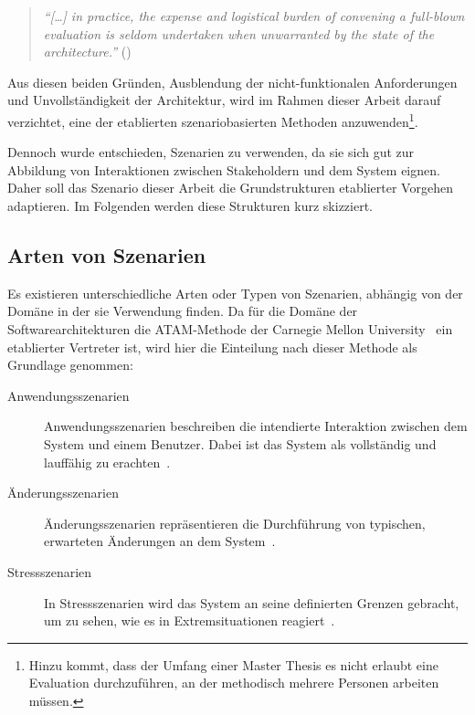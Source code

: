   \begin{quote}
    \emph{"`[\ldots] in practice, the expense and logistical burden of convening a full-blown evaluation is seldom undertaken when unwarranted by the state of the architecture."'} (\citep[S. 24]{evaluating_software_architectures})
  \end{quote}
  
  Aus diesen beiden Gründen, Ausblendung der nicht-funktionalen Anforderungen und Unvollständigkeit der Architektur, wird im Rahmen dieser Arbeit darauf verzichtet, eine der etablierten szenariobasierten Methoden anzuwenden\footnote{Hinzu kommt, dass der Umfang einer Master Thesis es nicht erlaubt eine Evaluation durchzuführen, an der methodisch mehrere Personen arbeiten müssen.}.
  
  Dennoch wurde entschieden, Szenarien zu verwenden, da sie sich gut zur Abbildung von Interaktionen zwischen Stakeholdern und dem System eignen. Daher soll das Szenario dieser Arbeit die Grundstrukturen etablierter Vorgehen adaptieren. Im Folgenden werden diese Strukturen kurz skizziert.
  
\subsection{Arten von Szenarien} %
\label{sub:arten_von_szenarien}

  Es existieren unterschiedliche Arten oder Typen von Szenarien, abhängig von der Domäne in der sie Verwendung finden. Da für die Domäne der Softwarearchitekturen die ATAM-Methode der Carnegie Mellon University~\citep{kazman2000ama} ein etablierter Vertreter ist, wird hier die Einteilung nach dieser Methode als Grundlage genommen:
  
  \begin{description}
    \item[Anwendungsszenarien] Anwendungsszenarien beschreiben die intendierte Interaktion zwischen dem System und einem Benutzer. Dabei ist das System als vollständig und lauffähig zu erachten~\cite[S. 14]{kazman2000ama}.
    \item[Änderungsszenarien] Änderungsszenarien repräsentieren die Durchführung von typischen, erwarteten Änderungen an dem System~\cite[S. 14f]{kazman2000ama}.
    \item[Stressszenarien] In Stressszenarien wird das System an seine definierten Grenzen gebracht, um zu sehen, wie es in Extremsituationen reagiert~\cite[S. 15]{kazman2000ama}.
  \end{description}
  
